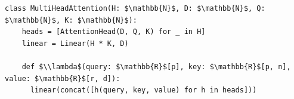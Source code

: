\documentclass[border=10pt]{standalone}
\begin{document}
\begin{lstlisting}
class MultiHeadAttention(H: $\mathbb{N}$, D: $\mathbb{N}$, Q: $\mathbb{N}$, K: $\mathbb{N}$):
    heads = [AttentionHead(D, Q, K) for _ in H]
    linear = Linear(H * K, D)

    def $\\lambda$(query: $\mathbb{R}$[p], key: $\mathbb{R}$[p, n], value: $\mathbb{R}$[r, d]):
      linear(concat([h(query, key, value) for h in heads]))
\end{lstlisting}
\end{document}
